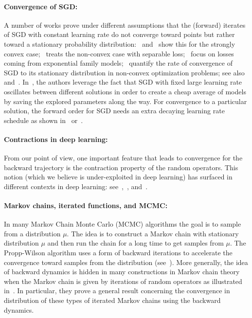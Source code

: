 \documentclass[10pt]{article} %
\theoremstyle{plain}
\theoremstyle{definition}
\theoremstyle{remark}
\begin{document}
\paragraph{Convergence of SGD:}
A number of works prove under different assumptions that the (forward) iterates of SGD with constant learning rate do not converge toward points but rather toward a stationary probability distribution:~\citet{merad2023convergence} and~\citet{dieuleveut2020bridging} show this for the strongly convex case;~\citet{shirokoff2024convergencemarkovchainsconstant} treats the non-convex case with separable loss;~\citet{babichev2018constantstepsizestochastic} focus on losses coming from exponential family models;~\citet{cheng2020stochastic} quantify the rate of convergence of SGD to its stationary distribution in non-convex optimization problems; see also~\citet{dieuleveut2016nonparametric} and~\citet{meyn_tweedie_1993}. In~\citet{huang2017snapshot}, the authors leverage the fact that SGD with fixed large learning rate oscillates between different solutions in order to create a cheap average of models by saving the explored parameters along the way. For convergence to a particular solution, the forward order for SGD needs an extra decaying learning rate schedule as shown in~\citet{robbins1951a_stochastic} or~\citet{mertikopoulos2020on}.

\paragraph{Contractions in deep learning:} 
From our point of view, one important feature that leads to convergence for the backward trajectory is the contraction property of the random operators. This notion (which we believe is under-exploited in deep learning) has surfaced in different contexts in deep learning: see~\citet{BFGQ19},~\citet{QW19}, and~\citet{AK22}. 

\paragraph{Markov chains, iterated functions, and MCMC:}
In many Markov Chain Monte Carlo (MCMC) algorithms the goal is to sample from a distribution $\mu$. The idea is to construct a Markov chain with stationary distribution $\mu$ and then run the chain for a long time to get samples from $\mu$. The Propp-Wilson algorithm uses a form of backward iterations to accelerate the convergence toward samples from the distribution (see~\citet{propp1996exact}). More generally, the idea of backward dynamics is hidden in many constructions in Markov chain theory when the Markov chain is given by iterations of random operators as illustrated in~\citet{diaconis1999iterated}. In particular, they prove a general result concerning the convergence in distribution of these types of iterated Markov chains using the backward dynamics.
\end{document}
